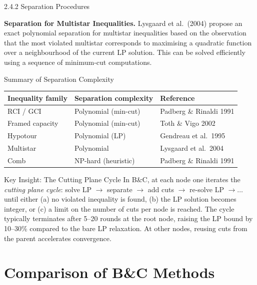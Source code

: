 \documentclass[aspectratio=169,10pt]{beamer}
\begin{document}
\begin{frame}[allowframebreaks]{2.4.2 Separation Procedures}
  \framebreak

  \textbf{Separation for Multistar Inequalities.}
  Lysgaard et al.\ (2004) propose an exact polynomial separation for
  multistar inequalities based on the observation that the most violated
  multistar corresponds to maximising a quadratic function over a
  neighbourhood of the current LP solution. This can be solved efficiently
  using a sequence of minimum-cut computations.

  \bigskip
  \begin{block}{Summary of Separation Complexity}
    \begin{tabular}{lll}
      \toprule
      Inequality family & Separation complexity & Reference \\
      \midrule
      RCI / GCI         & Polynomial (min-cut)  & Padberg \& Rinaldi 1991 \\
      Framed capacity   & Polynomial (min-cut)  & Toth \& Vigo 2002 \\
      Hypotour          & Polynomial (LP)       & Gendreau et al.\ 1995 \\
      Multistar         & Polynomial            & Lysgaard et al.\ 2004 \\
      Comb              & NP-hard (heuristic)   & Padberg \& Rinaldi 1991 \\
      \bottomrule
    \end{tabular}
  \end{block}

  \framebreak

  \begin{alertblock}{Key Insight: The Cutting Plane Cycle}
    In B\&C, at each node one iterates the \emph{cutting plane cycle}:
    solve LP $\to$ separate $\to$ add cuts $\to$ re-solve LP $\to \ldots$
    until either (a) no violated inequality is found, (b) the LP solution
    becomes integer, or (c) a limit on the number of cuts per node is reached.
    The cycle typically terminates after 5--20 rounds at the root node,
    raising the LP bound by 10--30\% compared to the bare LP relaxation.
    At other nodes, reusing cuts from the parent accelerates convergence.
  \end{alertblock}
\end{frame}

\section{Comparison of B\&C Methods}
\end{document}
